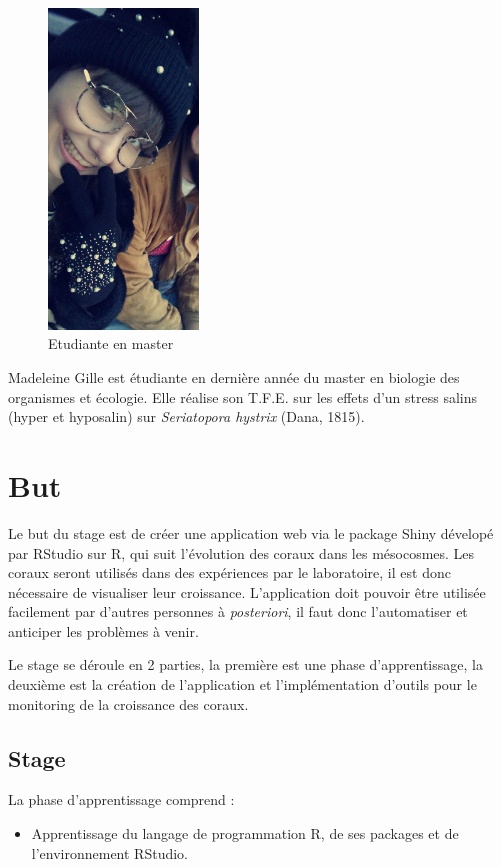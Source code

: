 \documentclass[]{report}
\providecommand{\tightlist}{%
  \setlength{\itemsep}{0pt}\setlength{\parskip}{0pt}}
\begin{document}
\begin{figure}[h!]
\includegraphics[width=4cm]{../image/madeleine.jpg}
\caption{Etudiante en master}
\end{figure}

Madeleine Gille est étudiante en dernière année du master en biologie
des organismes et écologie. Elle réalise son T.F.E. sur les effets d'un
stress salins (hyper et hyposalin) sur \emph{Seriatopora hystrix} (Dana,
1815).

\chapter{But}\label{but}

Le but du stage est de créer une application web via le package Shiny
dévelopé par RStudio sur R, qui suit l'évolution des coraux dans les
mésocosmes. Les coraux seront utilisés dans des expériences par le
laboratoire, il est donc nécessaire de visualiser leur croissance.
L'application doit pouvoir être utilisée facilement par d'autres
personnes à \emph{posteriori}, il faut donc l'automatiser et anticiper
les problèmes à venir.

Le stage se déroule en 2 parties, la première est une phase
d'apprentissage, la deuxième est la création de l'application et
l'implémentation d'outils pour le monitoring de la croissance des
coraux.

\section{Stage}\label{stage}

La phase d'apprentissage comprend :

\begin{itemize}
\tightlist
\item
  Apprentissage du langage de programmation R, de ses packages et de
  l'environnement RStudio.
\end{itemize}
\end{document}
